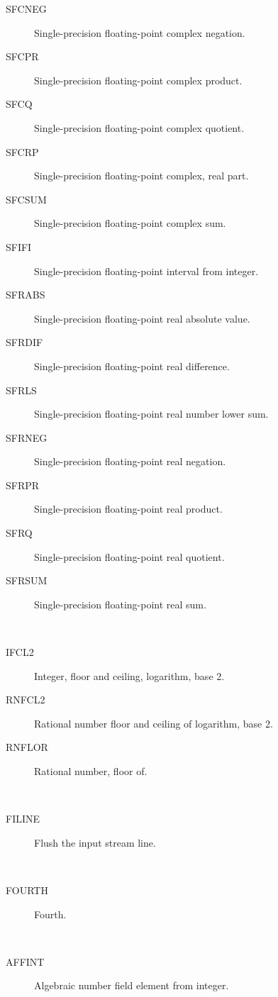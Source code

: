 \begin{description}
\begin{description}
  \item[SFCNEG]  Single-precision floating-point complex negation.
  \item[SFCPR]  Single-precision floating-point complex product.
  \item[SFCQ]  Single-precision floating-point complex quotient.
  \item[SFCRP]  Single-precision floating-point complex, real part.
  \item[SFCSUM]  Single-precision floating-point complex sum.
  \item[SFIFI]  Single-precision floating-point interval from integer.
  \item[SFRABS]  Single-precision floating-point real absolute value.
  \item[SFRDIF]  Single-precision floating-point real difference.
  \item[SFRLS]  Single-precision floating-point real number lower sum.
  \item[SFRNEG]  Single-precision floating-point real negation.
  \item[SFRPR]  Single-precision floating-point real product.
  \item[SFRQ]  Single-precision floating-point real quotient.
  \item[SFRSUM]  Single-precision floating-point real sum.
  \end{description}
\item[floor] \ \ 
  \begin{description}
  \item[IFCL2]  Integer, floor and ceiling, logarithm, base 2.
  \item[RNFCL2]  Rational number floor and ceiling of logarithm, base 2.
  \item[RNFLOR]  Rational number, floor of.
  \end{description}
\item[flush] \ \ 
  \begin{description}
  \item[FILINE]  Flush the input stream line.
  \end{description}
\item[fourth] \ \ 
  \begin{description}
  \item[FOURTH]  Fourth.
  \end{description}
\item[from] \ \ 
  \begin{description}
  \item[AFFINT]  Algebraic number field element from integer.

\end{description}
\end{description}
